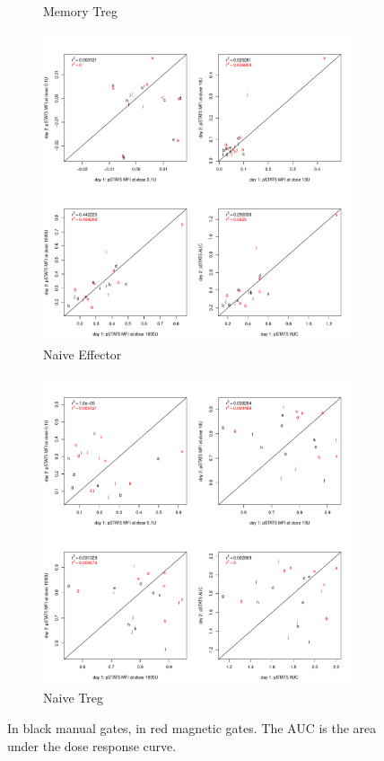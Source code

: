 \begin{figure}[h]
\begin{subfigure}[b]{.4\textwidth}
\caption{Memory Treg}
\end{subfigure}
\begin{subfigure}[b]{.4\textwidth}
  \includegraphics[scale=.25]{IL2/figures/repeatability-pstat5-mfi-Naive-Eff.pdf}
\caption{Naive Effector}
\end{subfigure}
\begin{subfigure}[b]{.4\textwidth}
  \includegraphics[scale=.25]{IL2/figures/repeatability-pstat5-mfi-Naive-Treg.pdf}
\caption{Naive Treg}
\end{subfigure}
\caption{
\label{figure:repeatability-gating}
In black manual gates, in red magnetic gates.
The AUC is the area under the dose response curve.
}
\end{figure}


